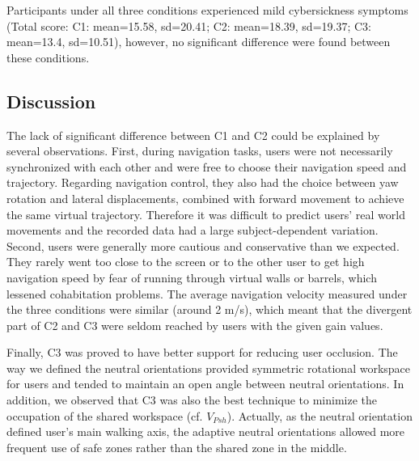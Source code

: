 Participants under all three conditions experienced mild cybersickness symptoms (Total score: C1: mean=15.58, sd=20.41; C2: mean=18.39, sd=19.37; C3: mean=13.4, sd=10.51), however, no significant difference were found between these conditions.

\subsection{Discussion}
The lack of significant difference between C1 and C2 could be explained by several observations. First, during navigation tasks, users were not necessarily synchronized with each other and were free to choose their navigation speed and trajectory. Regarding navigation control, they also had the choice between yaw rotation and lateral displacements, combined with forward movement to achieve the same virtual trajectory. Therefore it was difficult to predict users' real world movements and the recorded data had a large subject-dependent variation. Second, users were generally more cautious and conservative than we expected. They rarely went too close to the screen or to the other user to get high navigation speed by fear of running through virtual walls or barrels, which lessened cohabitation problems. The average navigation velocity measured under the three conditions were similar (around 2 m/s), which meant that the divergent part of C2 and C3 were seldom reached by users with the given gain values.

Finally, C3 was proved to have better support for reducing user occlusion. The way we defined the neutral orientations provided symmetric rotational workspace for users and tended to maintain an open angle between neutral orientations. In addition, we observed that C3 was also the best technique to minimize the occupation of the shared workspace (cf. $V_{Psh}$). Actually, as the neutral orientation defined user's main walking axis, the adaptive neutral orientations allowed more frequent use of safe zones rather than the shared zone in the middle.

